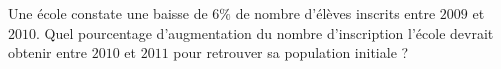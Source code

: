 
\begin{exercice}\label{exosmath-0102}

    Une école constate une baisse de \(6\%\) de nombre d'élèves inscrits entre \( 2009\) et \( 2010\). Quel pourcentage d'augmentation du nombre d'inscription l'école devrait obtenir entre \( 2010\) et \( 2011\) pour retrouver sa population initiale ?

\end{exercice}
